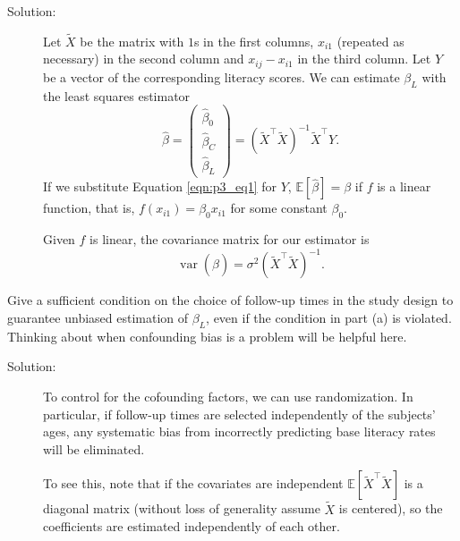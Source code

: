 \documentclass[11pt, letterpaper]{article}
\begin{document}
{\begin{enumerate}[(a)]
\begin{description}
\item[Solution:] Let $\tilde{X}$ be the matrix with $1$s in the first columns,
  $x_{i1}$ (repeated as necessary) in the second column and $x_{ij} - x_{i1}$ in
  the third column. Let $Y$ be a vector of the corresponding literacy scores. We
  can estimate $\beta_L$ with the least squares estimator
  \begin{equation}
    \hat{\beta} =
    \begin{pmatrix}
      \hat{\beta}_0 \\
      \hat{\beta}_C \\
      \hat{\beta}_L
    \end{pmatrix}
    =
    \left(\tilde{X}^\intercal\tilde{X}\right)^{-1}\tilde{X}^\intercal Y.
  \end{equation}
  If we substitute Equation \ref{eqn:p3_eq1} for $Y$,
  $\mathbb{E}\left[\hat{\beta}\right] = \beta$ if $f$ is a linear function, that
  is, $f\left(x_{i1}\right) = \beta_0x_{i1}$ for some constant $\beta_0$. 

  Given $f$ is linear, the covariance matrix for our estimator is
  \begin{equation}
    \operatorname{var}\left(\hat{\beta}\right)
    =
    \sigma^2\left(\tilde{X}^\intercal \tilde{X}\right)^{-1}.
  \end{equation}
\end{description}

{\em \item Give a sufficient condition on the choice of follow-up times in the study design to guarantee
unbiased estimation of $\beta_L$, even if the condition in part (a) is violated.  Thinking about
when confounding bias is a problem will be helpful here.}

\begin{description}
\item[Solution:] To control for the cofounding factors, we can use
  randomization. In particular, if follow-up times are selected independently of
  the subjects' ages, any systematic bias from incorrectly predicting base
  literacy rates will be eliminated.

  To see this, note that if the covariates are independent
  $\mathbb{E}\left[\tilde{X}^\intercal \tilde{X}\right]$ is a diagonal matrix
  (without loss of generality assume $\tilde{X}$ is centered), so the
  coefficients are estimated independently of each other.
\end{description}


\end{enumerate}}
\end{document}
